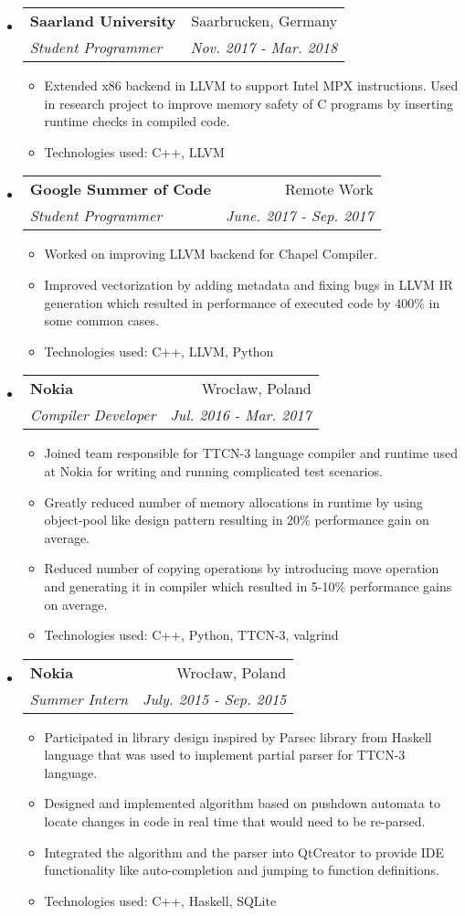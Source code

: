 \documentclass[letterpaper,11pt]{article}
\makeatletter
\newcommand{\resitem}[1]{\item #1 \vspace{-2pt}}
\newcommand{\ressubheading}[4]{
\begin{tabular*}{6.5in}{l@{\extracolsep{\fill}}r}
		\textbf{#1} & #2 \\
		\textit{#3} & \textit{#4} \\
\end{tabular*}\vspace{-6pt}}
\makeatother
\begin{document}
\begin{itemize}
\item
	\ressubheading{Saarland University}{Saarbrucken, Germany}{Student Programmer}{Nov. 2017 - Mar. 2018}
	\begin{itemize}
		\resitem{Extended x86 backend in LLVM to support Intel MPX instructions. Used in research project to improve memory safety of C programs by inserting runtime checks in compiled code. }
		\resitem{ Technologies used: C++, LLVM}
	\end{itemize}
\item
	\ressubheading{Google Summer of Code}{Remote Work}{Student Programmer}{June. 2017 - Sep. 2017}
	\begin{itemize}
		\resitem{ Worked on improving LLVM backend for Chapel Compiler. }
		\resitem{ Improved vectorization by adding metadata and fixing bugs in LLVM IR generation which resulted in performance of executed code by 400\% in some common cases. }
		\resitem{ Technologies used: C++, LLVM, Python}
	\end{itemize}
\item
	\ressubheading{Nokia}{Wrocław, Poland}{Compiler Developer}{Jul. 2016 - Mar. 2017}
	\begin{itemize}
		\resitem{ Joined team responsible for TTCN-3 language compiler and runtime used at Nokia for writing and running complicated test scenarios.}
		\resitem{ Greatly reduced number of memory allocations in runtime by using object-pool like design pattern resulting in 20\% performance gain on average.}
		\resitem{ Reduced number of copying operations by introducing move operation and generating it in compiler which resulted in 5-10\% performance gains on average.}
		\resitem{ Technologies used: C++, Python, TTCN-3, valgrind }
	\end{itemize}
\item
	\ressubheading{Nokia}{Wrocław, Poland}{Summer Intern}{ July. 2015 - Sep. 2015}
	\begin{itemize}
		\resitem{Participated in library design inspired by Parsec library from Haskell language that was used to implement partial parser for TTCN-3 language.}
    	\resitem{Designed and implemented algorithm based on pushdown automata to locate changes in code in real time that would need to be re-parsed.}
    	\resitem{Integrated the algorithm and the parser into QtCreator to provide IDE functionality like auto-completion and jumping to function definitions.}
    	\resitem{Technologies used: C++, Haskell, SQLite}
	\end{itemize}
\end{itemize}
\end{document}
